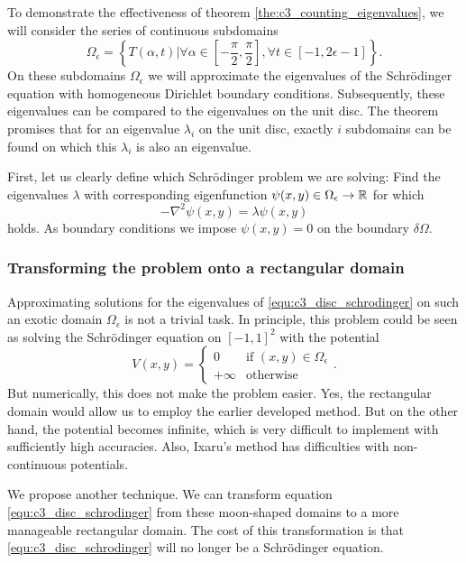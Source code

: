 To demonstrate the effectiveness of theorem \ref{the:c3_counting_eigenvalues}, we will consider the series of continuous subdomains
$$
    \Omega_\epsilon = \left\{T(\alpha, t) | \forall \alpha \in \left[-\frac{\pi}{2}, \frac{\pi}{2}\right], \forall t \in [-1, 2\epsilon - 1]  \right\}\text{.}
$$
On these subdomains $\Omega_\epsilon$ we will approximate the eigenvalues of the Schrödinger equation with homogeneous Dirichlet boundary conditions. Subsequently, these eigenvalues can be compared to the eigenvalues on the unit disc. The theorem promises that for an eigenvalue $\lambda_i$ on the unit disc, exactly $i$ subdomains can be found on which this $\lambda_i$ is also an eigenvalue.

First, let us clearly define which Schrödinger problem we are solving: Find the eigenvalues $\lambda$ with corresponding eigenfunction $\psi(x, y) \in \Omega_\epsilon \to \mathbb{R}$ for which
\begin{equation}\label{equ:c3_disc_schrodinger}
    -\nabla^2 \psi(x, y) = \lambda \psi(x, y)
\end{equation}
holds. As boundary conditions we impose $\psi(x, y) = 0$ on the boundary $\delta \Omega$.

\subsubsection{Transforming the problem onto a rectangular domain}

Approximating solutions for the eigenvalues of \eqref{equ:c3_disc_schrodinger} on such an exotic domain $\Omega_\epsilon$ is not a trivial task. In principle, this problem could be seen as solving the Schrödinger equation on $[-1,1]^2$ with the potential
$$
    V(x, y) = \begin{cases}
        0       & \text{if $(x, y)\in \Omega_\epsilon$} \\
        +\infty & \text{otherwise}
    \end{cases} {}\text{.}
$$
But numerically, this does not make the problem easier. Yes, the rectangular domain would allow us to employ the earlier developed method. But on the other hand, the potential becomes infinite, which is very difficult to implement with sufficiently high accuracies. Also, Ixaru's method has difficulties with non-continuous potentials.

We propose another technique. We can transform equation \eqref{equ:c3_disc_schrodinger} from these moon-shaped domains to a more manageable rectangular domain. The cost of this transformation is that \eqref{equ:c3_disc_schrodinger} will no longer be a Schrödinger equation.

